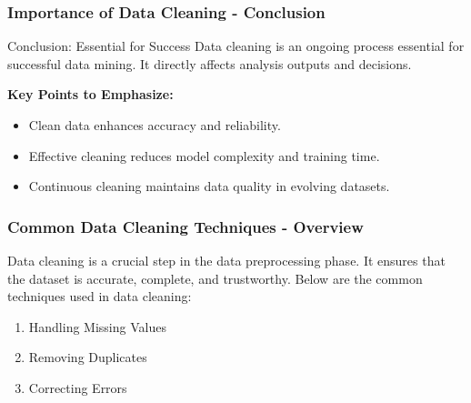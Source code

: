 \documentclass[aspectratio=169]{beamer}
\begin{document}
\begin{frame}[fragile]
    \frametitle{Importance of Data Cleaning - Conclusion}
    \begin{block}{Conclusion: Essential for Success}
        Data cleaning is an ongoing process essential for successful data mining. It directly affects analysis outputs and decisions.
        
        \textbf{Key Points to Emphasize:}
        \begin{itemize}
            \item Clean data enhances accuracy and reliability.
            \item Effective cleaning reduces model complexity and training time.
            \item Continuous cleaning maintains data quality in evolving datasets.
        \end{itemize}
    \end{block}
\end{frame}

\begin{frame}[fragile]
    \frametitle{Common Data Cleaning Techniques - Overview}
    Data cleaning is a crucial step in the data preprocessing phase. It ensures that the dataset is accurate, complete, and trustworthy. Below are the common techniques used in data cleaning:
    \begin{enumerate}
        \item Handling Missing Values
        \item Removing Duplicates
        \item Correcting Errors
    \end{enumerate}
\end{frame}
\end{document}
